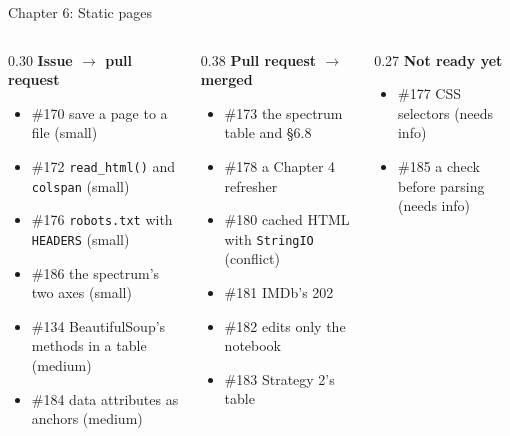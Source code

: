\documentclass[9pt,aspectratio=169]{beamer}
\begin{document}
\begin{frame}{Chapter 6: Static pages}
    \begin{columns}[T]
        \begin{column}{0.30\textwidth}
            \textbf{Issue $\to$ pull request}
            \begin{itemize}\small
                \item \#170 save a page to a file (small)
                \item \#172 \texttt{read\_html()} and \texttt{colspan} (small)
                \item \#176 \texttt{robots.txt} with \texttt{HEADERS} (small)
                \item \#186 the spectrum's two axes (small)
                \item \#134 BeautifulSoup's methods in a table (medium)
                \item \#184 data attributes as anchors (medium)
            \end{itemize}
        \end{column}
        \begin{column}{0.38\textwidth}
            \textbf{Pull request $\to$ merged}
            \begin{itemize}\small
                \item \#173 the spectrum table and §6.8
                \item \#178 a Chapter 4 refresher
                \item \#180 cached HTML with \texttt{StringIO} (conflict)
                \item \#181 IMDb's 202
                \item \#182 edits only the notebook
                \item \#183 Strategy 2's table
            \end{itemize}
        \end{column}
        \begin{column}{0.27\textwidth}
            \textbf{Not ready yet}
            \begin{itemize}\small
                \item \#177 CSS selectors (needs info)
                \item \#185 a check before parsing (needs info)
            \end{itemize}
        \end{column}
    \end{columns}
\end{frame}
\end{document}
